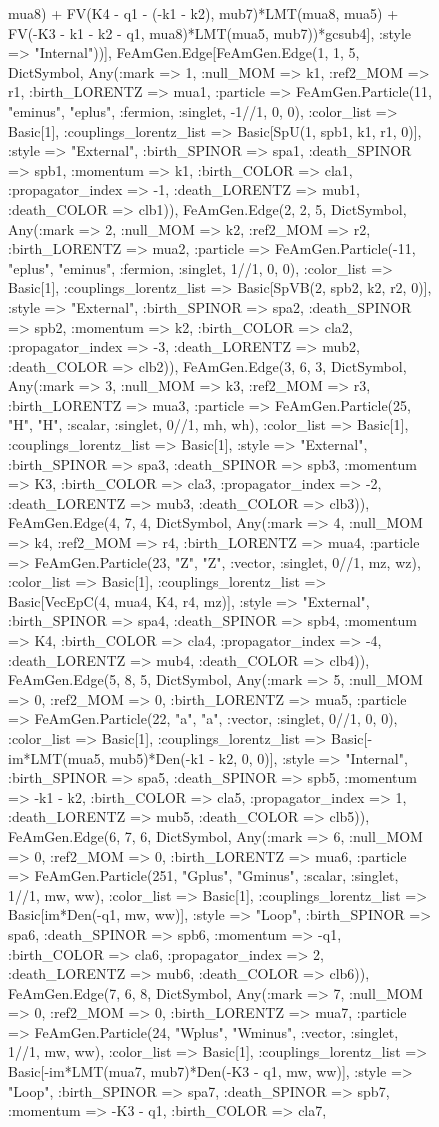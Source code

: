 \documentclass{revtex4}
\begin{document}
\begin{figure}[!htb]
\begin{center}
{mua8) + FV(K4 - q1 - (-k1 - k2), mub7)*LMT(mua8, mua5) + FV(-K3 - k1 - k2 - q1, mua8)*LMT(mua5, mub7))*gcsub4], :style => "Internal"))], FeAmGen.Edge[FeAmGen.Edge(1, 1, 5, Dict{Symbol, Any}(:mark => 1, :null_MOM => k1, :ref2_MOM => r1, :birth_LORENTZ => mua1, :particle => FeAmGen.Particle(11, "eminus", "eplus", :fermion, :singlet, -1//1, 0, 0), :color_list => Basic[1], :couplings_lorentz_list => Basic[SpU(1, spb1, k1, r1, 0)], :style => "External", :birth_SPINOR => spa1, :death_SPINOR => spb1, :momentum => k1, :birth_COLOR => cla1, :propagator_index => -1, :death_LORENTZ => mub1, :death_COLOR => clb1)), FeAmGen.Edge(2, 2, 5, Dict{Symbol, Any}(:mark => 2, :null_MOM => k2, :ref2_MOM => r2, :birth_LORENTZ => mua2, :particle => FeAmGen.Particle(-11, "eplus", "eminus", :fermion, :singlet, 1//1, 0, 0), :color_list => Basic[1], :couplings_lorentz_list => Basic[SpVB(2, spb2, k2, r2, 0)], :style => "External", :birth_SPINOR => spa2, :death_SPINOR => spb2, :momentum => k2, :birth_COLOR => cla2, :propagator_index => -3, :death_LORENTZ => mub2, :death_COLOR => clb2)), FeAmGen.Edge(3, 6, 3, Dict{Symbol, Any}(:mark => 3, :null_MOM => k3, :ref2_MOM => r3, :birth_LORENTZ => mua3, :particle => FeAmGen.Particle(25, "H", "H", :scalar, :singlet, 0//1, mh, wh), :color_list => Basic[1], :couplings_lorentz_list => Basic[1], :style => "External", :birth_SPINOR => spa3, :death_SPINOR => spb3, :momentum => K3, :birth_COLOR => cla3, :propagator_index => -2, :death_LORENTZ => mub3, :death_COLOR => clb3)), FeAmGen.Edge(4, 7, 4, Dict{Symbol, Any}(:mark => 4, :null_MOM => k4, :ref2_MOM => r4, :birth_LORENTZ => mua4, :particle => FeAmGen.Particle(23, "Z", "Z", :vector, :singlet, 0//1, mz, wz), :color_list => Basic[1], :couplings_lorentz_list => Basic[VecEpC(4, mua4, K4, r4, mz)], :style => "External", :birth_SPINOR => spa4, :death_SPINOR => spb4, :momentum => K4, :birth_COLOR => cla4, :propagator_index => -4, :death_LORENTZ => mub4, :death_COLOR => clb4)), FeAmGen.Edge(5, 8, 5, Dict{Symbol, Any}(:mark => 5, :null_MOM => 0, :ref2_MOM => 0, :birth_LORENTZ => mua5, :particle => FeAmGen.Particle(22, "a", "a", :vector, :singlet, 0//1, 0, 0), :color_list => Basic[1], :couplings_lorentz_list => Basic[-im*LMT(mua5, mub5)*Den(-k1 - k2, 0, 0)], :style => "Internal", :birth_SPINOR => spa5, :death_SPINOR => spb5, :momentum => -k1 - k2, :birth_COLOR => cla5, :propagator_index => 1, :death_LORENTZ => mub5, :death_COLOR => clb5)), FeAmGen.Edge(6, 7, 6, Dict{Symbol, Any}(:mark => 6, :null_MOM => 0, :ref2_MOM => 0, :birth_LORENTZ => mua6, :particle => FeAmGen.Particle(251, "Gplus", "Gminus", :scalar, :singlet, 1//1, mw, ww), :color_list => Basic[1], :couplings_lorentz_list => Basic[im*Den(-q1, mw, ww)], :style => "Loop", :birth_SPINOR => spa6, :death_SPINOR => spb6, :momentum => -q1, :birth_COLOR => cla6, :propagator_index => 2, :death_LORENTZ => mub6, :death_COLOR => clb6)), FeAmGen.Edge(7, 6, 8, Dict{Symbol, Any}(:mark => 7, :null_MOM => 0, :ref2_MOM => 0, :birth_LORENTZ => mua7, :particle => FeAmGen.Particle(24, "Wplus", "Wminus", :vector, :singlet, 1//1, mw, ww), :color_list => Basic[1], :couplings_lorentz_list => Basic[-im*LMT(mua7, mub7)*Den(-K3 - q1, mw, ww)], :style => "Loop", :birth_SPINOR => spa7, :death_SPINOR => spb7, :momentum => -K3 - q1, :birth_COLOR => cla7, }
\end{center}
\end{figure}
\end{document}
